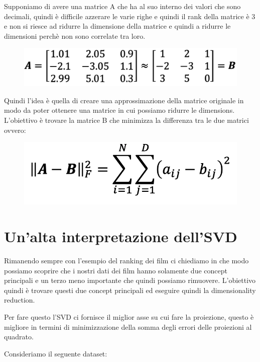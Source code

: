 \documentclass[14pt]{extreport}
\begin{document}
Supponiamo di avere una matrice A che ha al suo interno dei valori che sono decimali, quindi è difficile azzerare le varie righe e quindi il rank della matrice è 3 e non si 
riesce ad ridurre la dimensione della matrice e quindi a ridurre le dimensioni perchè non sono correlate tra loro.

\begin{figure}[H] 
\centering
\includegraphics[width=0.7\linewidth]{501.jpeg}
\end{figure}

Quindi l'idea è quella di creare una approssimazione della matrice originale in modo da poter ottenere una matrice in cui possiamo ridurre le dimensions.
L'obiettivo è trovare la matrice B che minimizza la differenza tra le due matrici ovvero:

\begin{figure}[H] 
\centering
\includegraphics[width=0.7\linewidth]{502.jpeg}
\end{figure}

\section{Un'alta interpretazione dell'SVD}

Rimanendo sempre con l'esempio del ranking dei film ci chiediamo in che modo possiamo scoprire che i nostri dati dei film hanno solamente due concept principali
e un terzo meno importante che quindi possiamo rimuovere. L'obiettivo quindi è trovare questi due concept principali ed eseguire quindi la dimensionality reduction.

Per fare questo l'SVD ci fornisce il miglior asse su cui fare la proiezione, questo è migliore in termini di minimizzazione della 
somma degli errori delle proiezioni al quadrato.

Consideriamo il seguente dataset:
\end{document}
